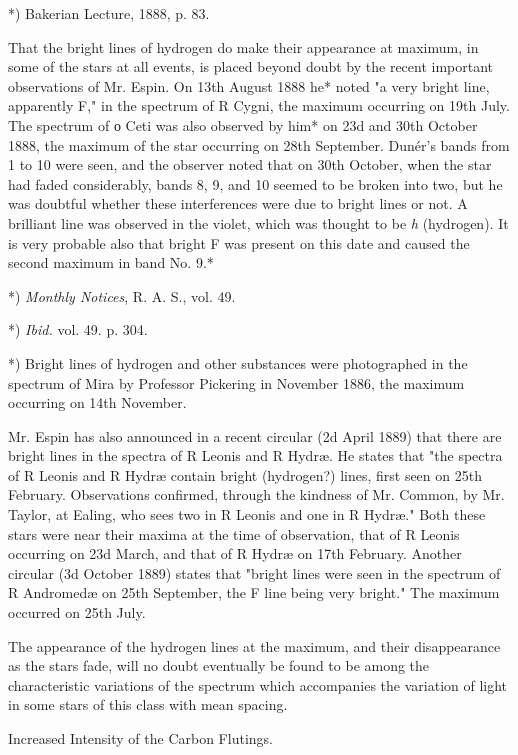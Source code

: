 \documentclass[a4paper, 12pt, oneside, polutonikogreek, english]{article}
\begin{document}
*) Bakerian Lecture, 1888, p. 83.

That the bright lines of hydrogen do make their appearance at maximum, in some of the stars at all events, is placed beyond doubt by the recent important observations of Mr. Espin. On 13th August 1888 he* noted "a very bright line, apparently F," in the spectrum of R Cygni, the maximum occurring on 19th July. The spectrum of ο Ceti was also observed by him* on 23d and 30th October 1888, the maximum of the star occurring on 28th September. Dunér's bands from 1 to 10 were seen, and the observer noted that on 30th October, when the star had faded considerably, bands 8, 9, and 10 seemed to be broken into two, but he was doubtful whether these interferences were due to bright lines or not. A brilliant line was observed in the violet, which was thought to be \emph{h} (hydrogen). It is very probable also that bright F was present on this date and caused the second maximum in band No. 9.*

*) \emph{Monthly Notices}, R. A. S., vol. 49.

*) \emph{Ibid.} vol. 49. p. 304.

*) Bright lines of hydrogen and other substances were photographed in the spectrum of Mira by Professor Pickering in November 1886, the maximum occurring on 14th November.

Mr. Espin has also announced in a recent circular (2d April 1889) that there are bright lines in the spectra of R Leonis and R Hydræ. He states that "the spectra of R Leonis and R Hydræ contain bright (hydrogen?) lines, first seen on 25th February. Observations confirmed, through the kindness of Mr. Common, by Mr. Taylor, at Ealing, who sees two in R Leonis and one in R Hydræ." Both these stars were near their maxima at the time of observation, that of R Leonis occurring on 23d March, and that of R Hydræ on 17th February. Another circular (3d October 1889) states that "bright lines were seen in the spectrum of R Andromedæ on 25th September, the F line being very bright." The maximum occurred on 25th July.

The appearance of the hydrogen lines at the maximum, and their disappearance as the stars fade, will no doubt eventually be found to be among the characteristic variations of the spectrum which accompanies the variation of light in some stars of this class with mean spacing.

Increased Intensity of the Carbon Flutings.
\end{document}
